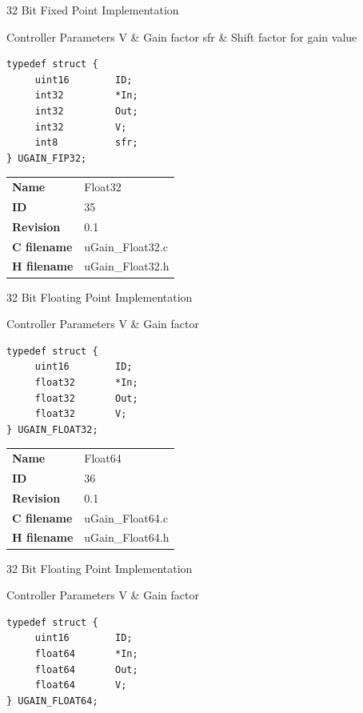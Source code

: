32 Bit Fixed Point Implementation

\begin{XtoCtabular}{Controller Parameters}
V & Gain factor\tabularnewline
\hline
sfr & Shift factor for gain value\tabularnewline
\hline
\end{XtoCtabular}

\begin{lstlisting}
typedef struct {
     uint16        ID;
     int32         *In;
     int32         Out;
     int32         V;
     int8          sfr;
} UGAIN_FIP32;
\end{lstlisting}

\ifdefined \AddTestReports
{}
\fi
{}
\nopagebreak[0]
\begin{tabular}{l l}
\textbf{Name} & Float32 \tabularnewline
\textbf{ID} & 35 \tabularnewline
\textbf{Revision} & 0.1 \tabularnewline
\textbf{C filename} & uGain\_Float32.c \tabularnewline
\textbf{H filename} & uGain\_Float32.h \tabularnewline
\end{tabular}
\vspace{1ex}

32 Bit Floating Point Implementation

\begin{XtoCtabular}{Controller Parameters}
V & Gain factor\tabularnewline
\hline
\end{XtoCtabular}

\begin{lstlisting}
typedef struct {
     uint16        ID;
     float32       *In;
     float32       Out;
     float32       V;
} UGAIN_FLOAT32;
\end{lstlisting}

\ifdefined \AddTestReports
{}
\fi
{}
\nopagebreak[0]
\begin{tabular}{l l}
\textbf{Name} & Float64 \tabularnewline
\textbf{ID} & 36 \tabularnewline
\textbf{Revision} & 0.1 \tabularnewline
\textbf{C filename} & uGain\_Float64.c \tabularnewline
\textbf{H filename} & uGain\_Float64.h \tabularnewline
\end{tabular}
\vspace{1ex}

32 Bit Floating Point Implementation

\begin{XtoCtabular}{Controller Parameters}
V & Gain factor\tabularnewline
\hline
\end{XtoCtabular}

\begin{lstlisting}
typedef struct {
     uint16        ID;
     float64       *In;
     float64       Out;
     float64       V;
} UGAIN_FLOAT64;
\end{lstlisting}

\ifdefined \AddTestReports
{}
\fi
